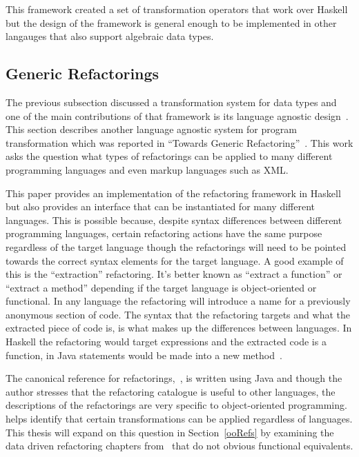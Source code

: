This framework created a set of transformation operators that work over Haskell but the design of the framework is general enough to be implemented in other langauges that also support algebraic data types.

\subsection{Generic Refactorings}

The previous subsection discussed a transformation system for data types and one of the main contributions of that framework is its language agnostic design~\citep{datatypeTransformation}. This section describes another language agnostic system for program transformation which was reported in ``Towards Generic Refactoring''~\citep{genericRefactoring}. This work asks the question what types of refactorings can be applied to many different programming languages and even markup languages such as XML. 

This paper provides an implementation of the refactoring framework in Haskell but also provides an interface that can be instantiated for many different languages. This is possible because, despite syntax differences between different programming languages, certain refactoring actions have the same purpose regardless of the target language though the refactorings will need to be pointed towards the correct syntax elements for the target language. A good example of this is the ``extraction'' refactoring. It's better known as ``extract a function'' or ``extract a method'' depending if the target language is object-oriented or functional. In any language the refactoring will introduce a name for a previously anonymous section of code. The syntax that the refactoring targets and what the extracted piece of code is, is what makes up the differences between languages. In Haskell the refactoring would target expressions and the extracted code is a function, in Java statements would be made into a new method~\citep{genericRefactoring}. 

The canonical reference for refactorings,~\cite{fowler}, is written using Java and though the author stresses that the refactoring catalogue is useful to other languages, the descriptions of the refactorings are very specific to object-oriented programming.~\cite{genericRefactoring} helps identify that certain transformations can be applied regardless of languages. This thesis will expand on this question in Section~\ref{ooRefs} by examining the data driven refactoring chapters from~\cite{fowler} that do not obvious functional equivalents.


